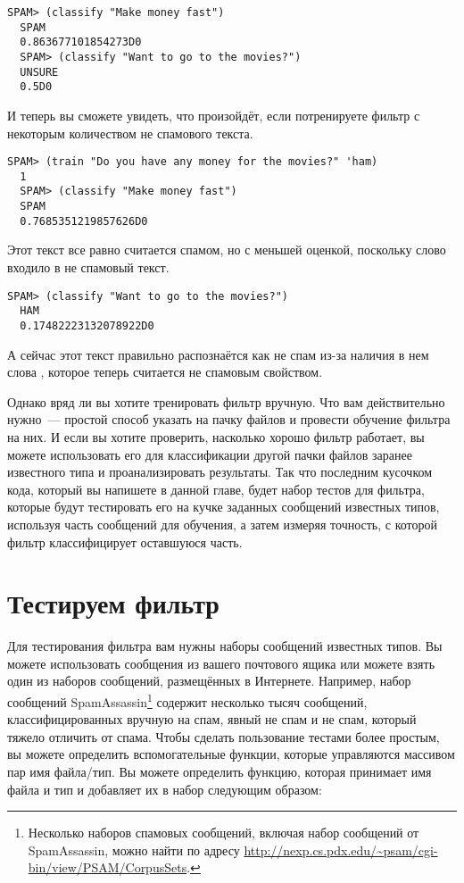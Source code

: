 \begin{lstlisting}[style=lisprepl]
  SPAM> (classify "Make money fast")
  SPAM
  0.863677101854273D0
  SPAM> (classify "Want to go to the movies?")
  UNSURE
  0.5D0
\end{lstlisting}

И теперь вы сможете увидеть, что произойдёт, если потренируете фильтр с некоторым
количеством не спамового текста.

\begin{lstlisting}[style=lisprepl]
  SPAM> (train "Do you have any money for the movies?" 'ham)
  1
  SPAM> (classify "Make money fast")
  SPAM
  0.7685351219857626D0
\end{lstlisting}

Этот текст все равно считается спамом, но с меньшей оценкой, поскольку слово 
входило в не спамовый текст.

\begin{lstlisting}[style=lisprepl]
  SPAM> (classify "Want to go to the movies?")
  HAM
  0.17482223132078922D0
\end{lstlisting}

А сейчас этот текст правильно распознаётся как не спам из-за наличия в нем слова
, которое теперь считается не спамовым свойством.

Однако вряд ли вы хотите тренировать фильтр вручную.  Что вам действительно нужно~---
простой способ указать на пачку файлов и провести обучение фильтра на них.  И если вы
хотите проверить, насколько хорошо фильтр работает, вы можете использовать его для
классификации другой пачки файлов заранее известного типа и проанализировать результаты.
Так что последним кусочком кода, который вы напишете в данной главе, будет набор тестов
для фильтра, которые будут тестировать его на кучке заданных сообщений известных типов,
используя часть сообщений для обучения, а затем измеряя точность, с которой фильтр
классифицирует оставшуюся часть.

\section{Тестируем фильтр}

Для тестирования фильтра вам нужны наборы сообщений известных типов.  Вы можете
использовать сообщения из вашего почтового ящика или можете взять один из наборов
сообщений, размещённых в Интернете.  Например, набор сообщений
SpamAssassin\footnote{Несколько наборов спамовых сообщений, включая набор сообщений от
  SpamAssassin, можно найти по адресу
  \url{http://nexp.cs.pdx.edu/~psam/cgi-bin/view/PSAM/CorpusSets}.} содержит несколько
тысяч сообщений, классифицированных вручную на спам, явный не спам и не спам, который
тяжело отличить от спама.  Чтобы сделать пользование тестами более простым, вы можете
определить вспомогательные функции, которые управляются массивом пар имя файла/тип.  Вы
можете определить функцию, которая принимает имя файла и тип и добавляет их в набор
следующим образом:

